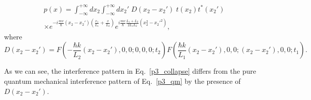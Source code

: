 \documentclass[12pt,groupedaddress,pra,aps]{revtex4-1}
\begin{document}
\begin{description}
\begin{equation}\label{p3_collapse}
\begin{split}
&p(x)=\int_{-\infty}^{+\infty} dx_2\int_{-\infty}^{+\infty}  dx_2' 
\; D(x_2-x_2') \;t(x_2)t^*(x_2') \\
&\times  e^{-i \frac{m v}{\hbar} (x_2- x_2')( \frac{x_1}{L_1}+\frac{x}{L_2}) } 
e^{i \frac{m v}{\hbar}\frac{L_1+L_2}{2L_1 L_2}(x_2^2-x_2'^2)},
\end{split}
\end{equation}
where 
\begin{equation}\label{Dfunc_sep}
D(x_2-x_2')=F(-\frac{\hbar k}{L_2}(x_2-x_2'),0,0;0,0,0;t_2)
F(\frac{\hbar k}{L_1}(x_2-x_2'),0,0;(x_2-x_2'),0,0;t_1).
\end{equation}
\end{description}
As we can see, the interference pattern in Eq.~\eqref{p3_collapse} differs from the pure quantum mechanical interference pattern of Eq.~\eqref{p3_qm} by the presence of $D(x_2-x_2')$. \\ \\
\end{document}
